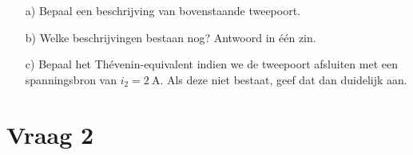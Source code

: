\documentclass{kuburgiearticle}
\begin{document}
	\vspace{0.5cm}

	\begin{enumerate}
		\item[a)] Bepaal een beschrijving van bovenstaande tweepoort.
		\item[b)] Welke beschrijvingen bestaan nog? Antwoord in één zin.
		\item[c)] Bepaal het Thévenin-equivalent indien we de tweepoort afsluiten met een spanningsbron van \({i_2=\SI{2}{\ampere}}\). Als deze niet bestaat, geef dat dan duidelijk aan.
	\end{enumerate}

	\newpage

	\section*{Vraag 2}
\end{document}
